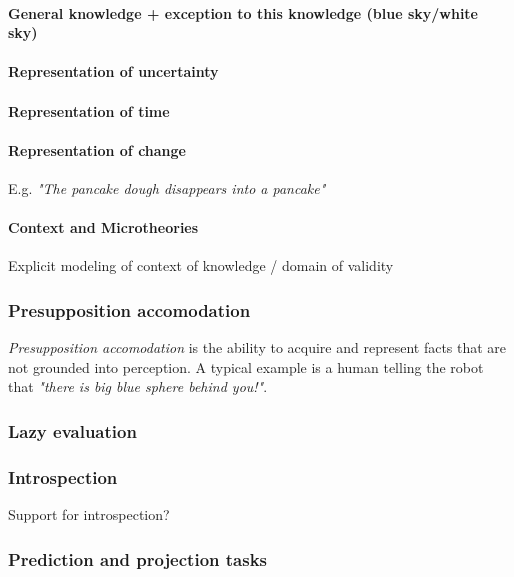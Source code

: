 \documentclass[a4paper]{article}
\begin{document}
\paragraph{General knowledge + exception to this knowledge (blue sky/white sky)}

\paragraph{Representation of uncertainty}

\paragraph{Representation of time}

\paragraph{Representation of change}

E.g. \emph{"The pancake dough disappears into a pancake"}
 
\paragraph{Context and Microtheories}
Explicit modeling of context of knowledge / domain of validity

\subsubsection{Presupposition accomodation}
\label{sect|presupposition-accomodation}

\emph{Presupposition accomodation} is the ability to acquire and represent facts that are not
grounded into perception. A typical example is a human telling the robot that
\emph{"there is big blue sphere behind you!"}.

\subsubsection{Lazy evaluation}
\label{sect|lazy-evaluation}


\subsubsection{Introspection}
\label{sect|introspection}
Support for introspection?

\subsubsection{Prediction and projection tasks}
\label{sect|prediction-projection}
\end{document}
